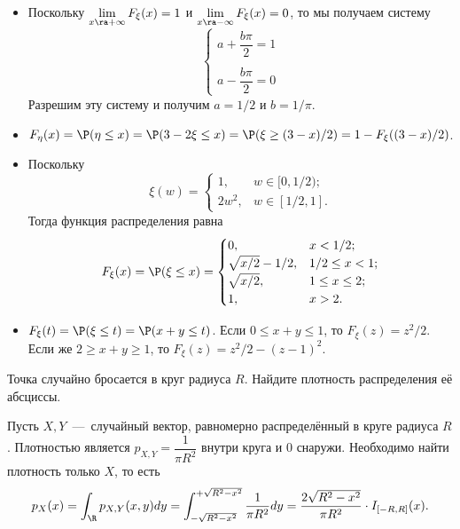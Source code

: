 \begin{solution} \leavevmode
    \begin{itemize}
        \item Поскольку $\lim\limits_{x \ra +\infty}F_\xi(x) = 1$ и $\lim\limits_{x \ra -\infty}F_\xi(x) = 0$, то мы получаем систему
        \[
            \begin{cases}
                a + \dfrac{b\pi}{2} = 1 \\ \\
                a - \dfrac{b\pi}{2} = 0
            \end{cases}
        \]
        Разрешим эту систему и получим $a = 1/2$ и $b = 1/\pi$.
        \item $F_\eta(x) = \P(\eta \leq x) = \P(3 - 2\xi \leq x) = \P(\xi \geq (3 - x)/2) = 1 - F_\xi((3 - x)/2)$.
        \item Поскольку
        \[
            \xi(w) = \begin{cases}
                         1, & w \in [0, 1/2); \\
                         2w^2, & w \in [1/2, 1].
            \end{cases}
        \]
        Тогда функция распределения равна
        \[
            F_{\xi}(x) = \P(\xi \leq x) =
            \begin{cases}
                0, & x < 1/2; \\
                \sqrt{x/2} - 1/2, & 1/2 \leq x < 1; \\
                \sqrt{x/2}, & 1 \leq x \leq 2; \\
                1, & x > 2.
            \end{cases}
        \]
        \item $F_\xi(t) = \P(\xi \leq t) = \P(x + y \leq t)$. Если $0 \leq x + y \leq 1$, то $F_\xi(z) = z^2/2$. Если же $2 \geq x + y \geq 1$, то $F_\xi(z) = z^2/2 - (z - 1)^2$.
    \end{itemize}
\end{solution}
\begin{problem}
    Точка случайно бросается в круг радиуса $R$.
    Найдите плотность распределения её абсциссы.
\end{problem}
\begin{solution}
    Пусть $X, Y$~---~случайный вектор, равномерно распределённый в круге радиуса $R$.
    Плотностью является $p_{X, Y} = \dfrac{1}{\pi R^2}$ внутри круга и 0 снаружи.
    Необходимо найти плотность только $X$, то есть
    \[
        p_X(x) = \int_{\R} p_{X, Y}(x, y)dy = \int_{-\sqrt{R^2 - x^2}}^{+\sqrt{R^2 - x^2}} \dfrac{1}{\pi R^2}dy = \dfrac{2\sqrt{R^2 - x^2}}{\pi R^2} \cdot I_{[-R, R]}(x).
    \]
\end{solution}
